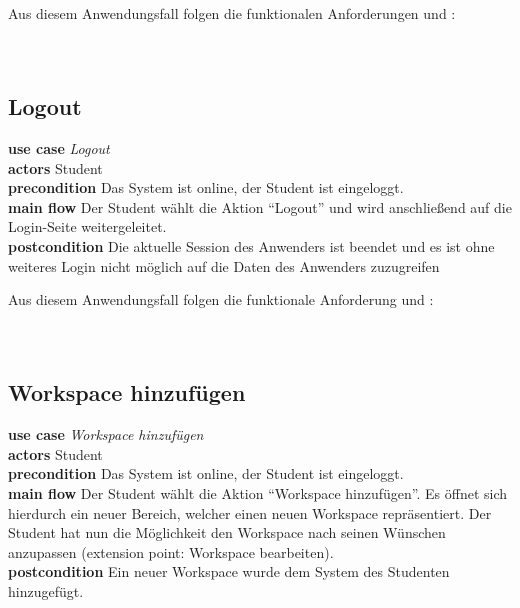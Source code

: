 Aus diesem Anwendungsfall folgen die funktionalen Anforderungen  und :\\
\requirement{\requirementLogin}\label{requirementLogin}\\
\requirement{\requirementZugriffAufEigeneWidgets}\label{requirementZugriffAufEigeneWidgets}\\

 \subsection{Logout}
\textbf{use case} \emph{Logout}\\
\textbf{actors} Student\\
\textbf{precondition} Das System ist online, der Student ist eingeloggt.\\
\textbf{main flow} Der Student wählt die Aktion "`Logout"' und wird anschließend auf die Login-Seite weitergeleitet.\\
\textbf{postcondition} Die aktuelle Session des Anwenders ist beendet und es ist ohne weiteres Login nicht möglich auf die Daten des Anwenders zuzugreifen 
 
Aus diesem Anwendungsfall folgen die funktionale Anforderung  und :\\
\requirement{\requirementLogout}\label{requirementLogout}\\
\requirement{\requirementKeinZugriffNachLogout}\label{requirementKeinZugriffNachLogout}\\
 
\subsection{Workspace hinzufügen}
\textbf{use case} \emph{Workspace hinzufügen}\\
\textbf{actors} Student\\
\textbf{precondition} Das System ist online, der Student ist eingeloggt.\\
\textbf{main flow} Der Student wählt die Aktion "`Workspace hinzufügen"'. Es öffnet sich hierdurch ein neuer Bereich, welcher einen neuen Workspace repräsentiert. Der Student hat nun die Möglichkeit den Workspace nach seinen Wünschen anzupassen (extension point: Workspace bearbeiten).\\
\textbf{postcondition} Ein neuer Workspace wurde dem System des Studenten hinzugefügt.
 
